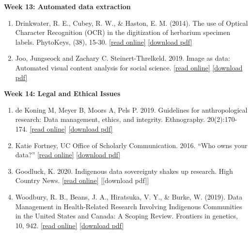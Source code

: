 \documentclass[
  12pt,
]{article}
\begin{document}
\textbf{Week 13: Automated data extraction}

\begin{enumerate}
\def\labelenumi{\arabic{enumi}.}
\item
  Drinkwater, R. E., Cubey, R. W., \& Haston, E. M. (2014). The use of
  Optical Character Recognition (OCR) in the digitization of herbarium
  specimen labels. PhytoKeys, (38), 15-30.
  \href{doi:10.3897/phytokeys.38.7168}{{[}read online{]}}
  \href{https://github.com/BrunaLab/LAS6292_DataManagement/blob/master/Assigned_Readings/Drinkwater_etal_2014.pdf}{{[}download
  pdf{]}}
\item
  Joo, Jungseock and Zachary C. Steinert-Threlkeld. 2019. Image as data:
  Automated visual content analysis for social science.
  \href{https://ocean.sagepub.com/blog/image-as-data-automated-visual-content-analysis-for-social-science}{{[}read
  online{]}}
  \href{https://github.com/BrunaLab/LAS6292_DataManagement/blob/master/Assigned_Readings/Joo_and_Steinert-Threlkeld_2019.pdf}{{[}download
  pdf{]}}
\end{enumerate}

\textbf{Week 14: Legal and Ethical Issues}

\begin{enumerate}
\def\labelenumi{\arabic{enumi}.}
\item
  de Koning M, Meyer B, Moors A, Pels P. 2019. Guidelines for
  anthropological research: Data management, ethics, and integrity.
  Ethnography. 20(2):170-174.
  \href{https://journals.sagepub.com/doi/10.1177/1466138119843312}{{[}read
  online{]}}
  \href{https://github.com/BrunaLab/LAS6292_DataManagement/blob/master/Assigned_Readings/Koning_etal_2019.pdf}{{[}download
  pdf{]}}
\item
  Katie Fortney, UC Office of Scholarly Communication. 2016. ``Who owns
  your data?''
  \href{https://uc3.cdlib.org/2016/09/08/who-owns-your-data/}{{[}read
  online{]}}
  \href{https://github.com/BrunaLab/LAS6292_DataManagement/blob/master/Assigned_Readings/Fortney_2016.pdf}{{[}download
  pdf{]}}
\item
  Goodluck, K. 2020. Indigenous data sovereignty shakes up research.
  High Country News.
  \href{https://www.hcn.org/issues/52.11/indigenous-affairs-covid19-indigenous-data-sovereignty-shakes-up-research}{{[}read
  online{]}} {[}{[}download pdf{]}{]}
\item
  Woodbury, R. B., Beans, J. A., Hiratsuka, V. Y., \& Burke, W. (2019).
  Data Management in Health-Related Research Involving Indigenous
  Communities in the United States and Canada: A Scoping Review.
  Frontiers in genetics, 10, 942.
  \href{https://doi.org/10.3389/fgene.2019.00942}{{[}read online{]}}
  \href{https://github.com/BrunaLab/LAS6292_DataManagement/blob/master/Assigned_Readings/Goodluck_2020.pdf}{{[}download
  pdf{]}}
\end{enumerate}
\end{document}
